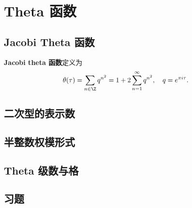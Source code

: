 \chapter{Theta 函数}
\label{ch:theta-functions}

\section{Jacobi Theta 函数}

\begin{definition}
\textbf{Jacobi theta 函数}定义为
\[
  \theta(\tau) = \sum_{n \in \Z} q^{n^2} = 1 + 2\sum_{n=1}^{\infty} q^{n^2},
  \quad q = e^{\pi i \tau}.
\]
\end{definition}


\section{二次型的表示数}


\section{半整数权模形式}


\section{Theta 级数与格}


\section{习题}
